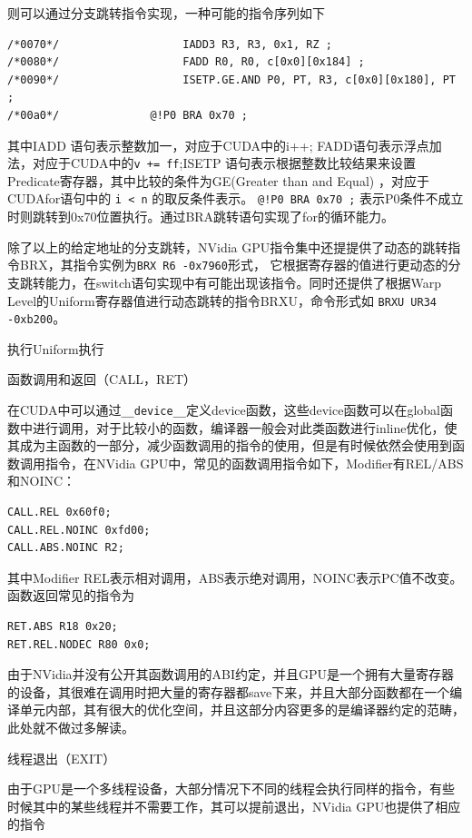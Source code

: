 则可以通过分支跳转指令实现，一种可能的指令序列如下

\begin{lstlisting}
/*0070*/                   IADD3 R3, R3, 0x1, RZ ;
/*0080*/                   FADD R0, R0, c[0x0][0x184] ;
/*0090*/                   ISETP.GE.AND P0, PT, R3, c[0x0][0x180], PT ;
/*00a0*/              @!P0 BRA 0x70 ;
\end{lstlisting}

其中IADD 语句表示整数加一，对应于CUDA中的i++; FADD语句表示浮点加法，对应于CUDA中的\lstinline|v += ff|;ISETP 语句表示根据整数比较结果来设置Predicate寄存器，其中比较的条件为GE(Greater than and Equal) ，对应于CUDAfor语句中的 \lstinline|i < n| 的取反条件表示。 \lstinline|@!P0 BRA 0x70 ;| 表示P0条件不成立时则跳转到0x70位置执行。通过BRA跳转语句实现了for的循环能力。

除了以上的给定地址的分支跳转，NVidia GPU指令集中还提提供了动态的跳转指令BRX，其指令实例为\lstinline|BRX R6 -0x7960|形式， 它根据寄存器的值进行更动态的分支跳转能力，在switch语句实现中有可能出现该指令。同时还提供了根据Warp Level的Uniform寄存器值进行动态跳转的指令BRXU，命令形式如 \lstinline|BRXU UR34 -0xb200|。

执行Uniform执行

函数调用和返回（CALL，RET）

在CUDA中可以通过\lstinline|__device__|定义device函数，这些device函数可以在global函数中进行调用，对于比较小的函数，编译器一般会对此类函数进行inline优化，使其成为主函数的一部分，减少函数调用的指令的使用，但是有时候依然会使用到函数调用指令，在NVidia GPU中，常见的函数调用指令如下，Modifier有REL/ABS和NOINC：

\begin{lstlisting}
CALL.REL 0x60f0;
CALL.REL.NOINC 0xfd00;
CALL.ABS.NOINC R2;
\end{lstlisting}

其中Modifier REL表示相对调用，ABS表示绝对调用，NOINC表示PC值不改变。函数返回常见的指令为

\begin{lstlisting}
RET.ABS R18 0x20;
RET.REL.NODEC R80 0x0;
\end{lstlisting}

由于NVidia并没有公开其函数调用的ABI约定，并且GPU是一个拥有大量寄存器的设备，其很难在调用时把大量的寄存器都save下来，并且大部分函数都在一个编译单元内部，其有很大的优化空间，并且这部分内容更多的是编译器约定的范畴，此处就不做过多解读。

线程退出（EXIT）

由于GPU是一个多线程设备，大部分情况下不同的线程会执行同样的指令，有些时候其中的某些线程并不需要工作，其可以提前退出，NVidia GPU也提供了相应的指令

